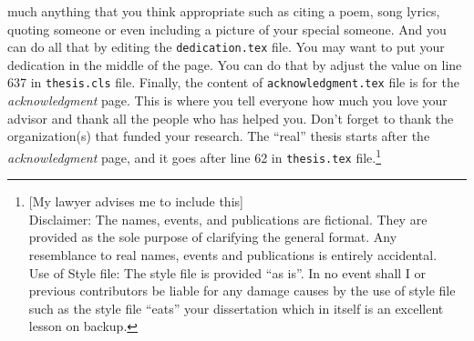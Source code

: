 much anything that you think appropriate such as citing a poem, song lyrics, quoting someone or even including a picture of your special someone.  And you can do all that by editing the
\verb#dedication.tex# file.  You may want to put your dedication in the
middle of the page.  You can do that by adjust the value on line 637 in
\verb#thesis.cls# file.  Finally, the content of \verb#acknowledgment.tex#
file is for the {\em acknowledgment} page.  This is where you tell everyone
how much you love your advisor and thank all the people who has helped you.
Don't forget to thank the organization(s) that funded your research.  The
``real'' thesis starts after the {\em acknowledgment} page, and it goes after
line 62 in \verb#thesis.tex# file.\footnote{[My lawyer advises me to include this] \\
{\sc Disclaimer}:  The names, events,
and publications are fictional.  They are provided as the sole purpose of
clarifying the general format.  Any resemblance to real names, events and
publications is entirely accidental. \\
{\sc Use of Style file}: The style file is provided ``as is''. In no event shall I or previous contributors be liable for any damage causes by the use of style file such as the style file ``eats'' your dissertation which in itself is an excellent lesson on backup.}
